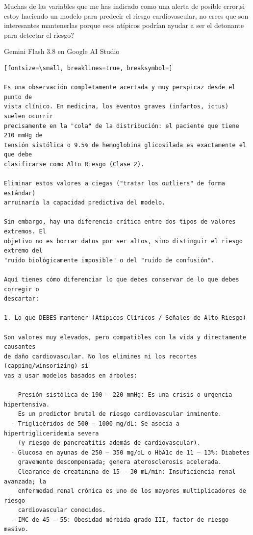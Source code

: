 \documentclass[12pt,a4paper,oneside]{book}
\begin{document}
\begin{iaprompt}
Muchas de las variables que me has indicado como una alerta de posible error,si
estoy haciendo un modelo para predecir el riesgo cardiovascular, no crees que
son interesantes mantenerlas porque esos atípicos podrían ayudar a ser el
detonante para detectar el riesgo?
\end{iaprompt}
\begin{iaresp}{Gemini Flash 3.8 en Google AI Studio}
\begin{Verbatim}[fontsize=\small, breaklines=true, breaksymbol=]

Es una observación completamente acertada y muy perspicaz desde el punto de
vista clínico. En medicina, los eventos graves (infartos, ictus) suelen ocurrir
precisamente en la "cola" de la distribución: el paciente que tiene 210 mmHg de
tensión sistólica o 9.5% de hemoglobina glicosilada es exactamente el que debe
clasificarse como Alto Riesgo (Clase 2).

Eliminar estos valores a ciegas ("tratar los outliers" de forma estándar)
arruinaría la capacidad predictiva del modelo.

Sin embargo, hay una diferencia crítica entre dos tipos de valores extremos. El
objetivo no es borrar datos por ser altos, sino distinguir el riesgo extremo del
"ruido biológicamente imposible" o del "ruido de confusión".

Aquí tienes cómo diferenciar lo que debes conservar de lo que debes corregir o
descartar:

1. Lo que DEBES mantener (Atípicos Clínicos / Señales de Alto Riesgo)

Son valores muy elevados, pero compatibles con la vida y directamente causantes
de daño cardiovascular. No los elimines ni los recortes (capping/winsorizing) si
vas a usar modelos basados en árboles:

  - Presión sistólica de 190 – 220 mmHg: Es una crisis o urgencia hipertensiva.
    Es un predictor brutal de riesgo cardiovascular inminente.
  - Triglicéridos de 500 – 1000 mg/dL: Se asocia a hipertrigliceridemia severa
    (y riesgo de pancreatitis además de cardiovascular).
  - Glucosa en ayunas de 250 – 350 mg/dL o HbA1c de 11 – 13%: Diabetes
    gravemente descompensada; genera aterosclerosis acelerada.
  - Clearance de creatinina de 15 – 30 mL/min: Insuficiencia renal avanzada; la
    enfermedad renal crónica es uno de los mayores multiplicadores de riesgo
    cardiovascular conocidos.
  - IMC de 45 – 55: Obesidad mórbida grado III, factor de riesgo masivo.


\end{Verbatim}
\end{iaresp}
\end{document}
